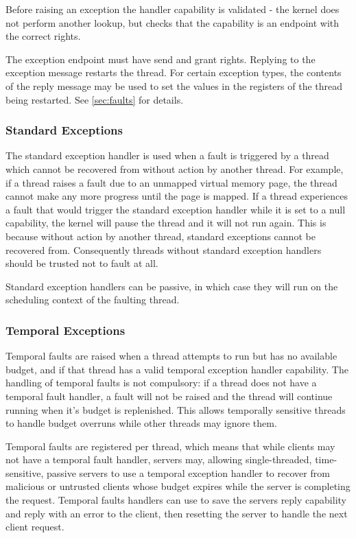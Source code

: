Before raising an exception the handler capability is validated - the kernel does not perform another lookup, but checks that the capability is an endpoint with the correct rights.

The exception endpoint must have send and grant rights. Replying to the
exception message restarts the thread. For certain exception types, the contents of
the reply message may be used to set the values in the registers of the
thread being restarted.
See \autoref{sec:faults} for details.

\subsubsection{Standard Exceptions}

The standard exception handler is used when a fault is triggered by a thread which cannot be recovered from without action by another thread.
For example, if a thread raises a fault due to an unmapped virtual memory page, the thread cannot make any more progress until the page is mapped.
If a thread experiences a fault that would trigger the standard exception handler while it is set to a null capability, the kernel will pause the thread and it will not run again. 
This is because without action by another thread, standard exceptions cannot be recovered from.
Consequently threads without standard exception handlers should be trusted not to fault at all.

Standard exception handlers can be passive, in which case they will run on the scheduling context of the faulting thread.

\subsubsection{Temporal Exceptions}
\label{sec:temporal-exceptions}

Temporal faults are raised when a thread attempts to run but has no available budget, and if that thread has a valid temporal exception handler capability.
The handling of temporal faults is not compulsory: if a thread does not have a temporal fault handler, a fault will not be raised and the thread will continue running when it's budget is replenished.
This allows temporally sensitive threads to handle budget overruns while other threads may ignore them.

Temporal faults are registered per thread, which means that while clients may not have a temporal fault handler, servers may, allowing single-threaded, time-sensitive, passive servers to use a temporal exception handler to recover from malicious or untrusted clients whose budget expires while the server is completing the request.
Temporal faults handlers can use  to save the servers reply capability and reply with an error to the client, then resetting the server to handle the next client request.


